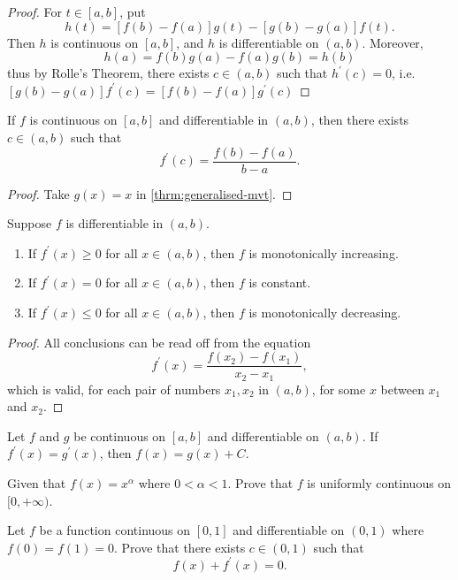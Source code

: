 \begin{proof}
For $t\in[a,b]$, put
\[h(t)=[f(b)-f(a)]g(t)-[g(b)-g(a)]f(t).\]
Then $h$ is continuous on $[a,b]$, and $h$ is differentiable on $(a,b)$. Moreover,
\[h(a)=f(b)g(a)-f(a)g(b)=h(b)\]
thus by Rolle's Theorem, there exists $c\in(a,b)$ such that $h^\prime(c)=0$, i.e. $[g(b)-g(a)]f^\prime(c)=[f(b)-f(a)]g^\prime(c)$
\end{proof}

\begin{theorem}\label{thrm:mvt}
If $f$ is continuous on $[a,b]$ and differentiable in $(a,b)$, then there exists $c\in(a,b)$ such that
\[ f^\prime(c)=\frac{f(b)-f(a)}{b-a}. \]
\end{theorem}

\begin{proof}
Take $g(x)=x$ in \cref{thrm:generalised-mvt}.
\end{proof}

\begin{proposition}
Suppose $f$ is differentiable in $(a,b)$.
\begin{enumerate}[label=(\roman*)]
\item If $f^\prime(x)\ge0$ for all $x\in(a,b)$, then $f$ is monotonically increasing.
\item If $f^\prime(x)=0$ for all $x\in(a,b)$, then $f$ is constant.
\item If $f^\prime(x)\le0$ for all $x\in(a,b)$, then $f$ is monotonically decreasing.
\end{enumerate}
\end{proposition}

\begin{proof}
All conclusions can be read off from the equation
\[f^\prime(x)=\frac{f(x_2)-f(x_1)}{x_2-x_1},\]
which is valid, for each pair of numbers $x_1,x_2$ in $(a,b)$, for some $x$ between
$x_1$ and $x_2$.
\end{proof}

\begin{exercise}
Let $f$ and $g$ be continuous on $[a,b]$ and differentiable on $(a,b)$. If $f^\prime(x)=g^\prime(x)$, then $f(x)=g(x)+C$.
\end{exercise}

\begin{exercise}
Given that $f(x)=x^\alpha$ where $0<\alpha<1$. Prove that $f$ is uniformly continuous on $[0,+\infty)$.
\end{exercise}

\begin{exercise}
Let $f$ be a function continuous on $[0,1]$ and differentiable on $(0,1)$ where $f(0)=f(1)=0$. Prove that there exists $c\in(0,1)$ such that
\[ f(x)+f^\prime(x)=0. \]
\end{exercise}

